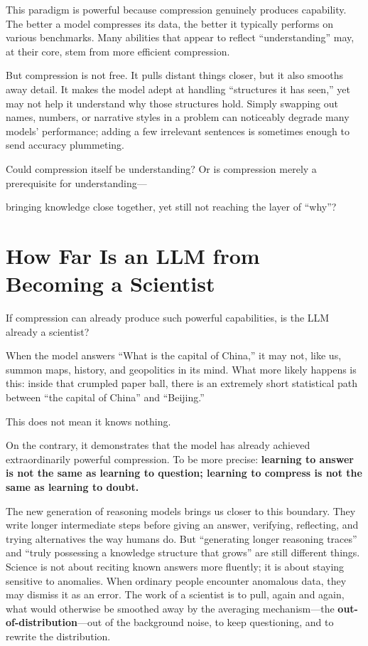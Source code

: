 This paradigm is powerful because compression genuinely produces capability. The better a model compresses its data, the better it typically performs on various benchmarks. Many abilities that appear to reflect ``understanding'' may, at their core, stem from more efficient compression.

\vspace{1em}

But compression is not free. It pulls distant things closer, but it also smooths away detail. It makes the model adept at handling ``structures it has seen,'' yet may not help it understand why those structures hold. Simply swapping out names, numbers, or narrative styles in a problem can noticeably degrade many models' performance; adding a few irrelevant sentences is sometimes enough to send accuracy plummeting.

\begin{thinkbox}
Could compression itself be understanding? Or is compression merely a prerequisite for understanding---

bringing knowledge close together, yet still not reaching the layer of ``why''?
\end{thinkbox}

\newpage
\section{How Far Is an LLM from Becoming a Scientist}

If compression can already produce such powerful capabilities, is the LLM already a scientist?

When the model answers ``What is the capital of China,'' it may not, like us, summon maps, history, and geopolitics in its mind. What more likely happens is this: inside that crumpled paper ball, there is an extremely short statistical path between ``the capital of China'' and ``Beijing.''

\vspace{1em}

This does not mean it knows nothing.

On the contrary, it demonstrates that the model has already achieved extraordinarily powerful compression. To be more precise: \textbf{learning to answer is not the same as learning to question; learning to compress is not the same as learning to doubt.}

The new generation of reasoning models brings us closer to this boundary.
They write longer intermediate steps before giving an answer, verifying, reflecting, and trying alternatives the way humans do. But ``generating longer reasoning traces'' and ``truly possessing a knowledge structure that grows'' are still different things.
Science is not about reciting known answers more fluently; it is about staying sensitive to anomalies.
When ordinary people encounter anomalous data, they may dismiss it as an error.
The work of a scientist is to pull, again and again, what would otherwise be smoothed away by the averaging mechanism---the \textbf{out-of-distribution}---out of the background noise, to keep questioning, and to rewrite the distribution.

